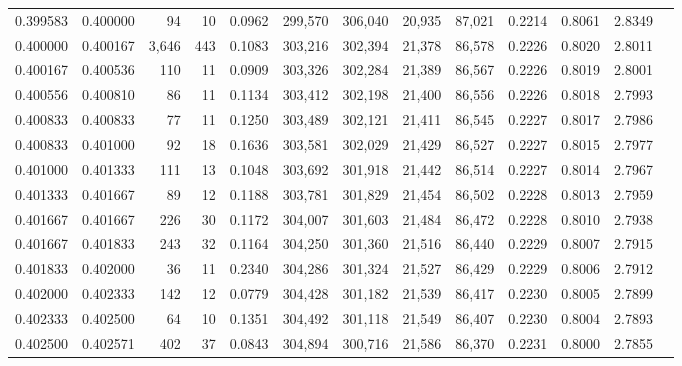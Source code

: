\begin{tabular}{rrrrrrrrrrrrr}
0.399583 & 0.400000 &    94 &  10 &                                     0.0962 & 299,570 & 306,040 &  20,935 &  87,021 & 0.2214 & 0.8061 & 2.8349 \\
0.400000 & 0.400167 & 3,646 & 443 &                                     0.1083 & 303,216 & 302,394 &  21,378 &  86,578 & 0.2226 & 0.8020 & 2.8011 \\
0.400167 & 0.400536 &   110 &  11 &                                     0.0909 & 303,326 & 302,284 &  21,389 &  86,567 & 0.2226 & 0.8019 & 2.8001 \\
0.400556 & 0.400810 &    86 &  11 &                                     0.1134 & 303,412 & 302,198 &  21,400 &  86,556 & 0.2226 & 0.8018 & 2.7993 \\
0.400833 & 0.400833 &    77 &  11 &                                     0.1250 & 303,489 & 302,121 &  21,411 &  86,545 & 0.2227 & 0.8017 & 2.7986 \\
0.400833 & 0.401000 &    92 &  18 &                                     0.1636 & 303,581 & 302,029 &  21,429 &  86,527 & 0.2227 & 0.8015 & 2.7977 \\
0.401000 & 0.401333 &   111 &  13 &                                     0.1048 & 303,692 & 301,918 &  21,442 &  86,514 & 0.2227 & 0.8014 & 2.7967 \\
0.401333 & 0.401667 &    89 &  12 &                                     0.1188 & 303,781 & 301,829 &  21,454 &  86,502 & 0.2228 & 0.8013 & 2.7959 \\
0.401667 & 0.401667 &   226 &  30 &                                     0.1172 & 304,007 & 301,603 &  21,484 &  86,472 & 0.2228 & 0.8010 & 2.7938 \\
0.401667 & 0.401833 &   243 &  32 &                                     0.1164 & 304,250 & 301,360 &  21,516 &  86,440 & 0.2229 & 0.8007 & 2.7915 \\
0.401833 & 0.402000 &    36 &  11 &                                     0.2340 & 304,286 & 301,324 &  21,527 &  86,429 & 0.2229 & 0.8006 & 2.7912 \\
0.402000 & 0.402333 &   142 &  12 &                                     0.0779 & 304,428 & 301,182 &  21,539 &  86,417 & 0.2230 & 0.8005 & 2.7899 \\
0.402333 & 0.402500 &    64 &  10 &                                     0.1351 & 304,492 & 301,118 &  21,549 &  86,407 & 0.2230 & 0.8004 & 2.7893 \\
0.402500 & 0.402571 &   402 &  37 &                                     0.0843 & 304,894 & 300,716 &  21,586 &  86,370 & 0.2231 & 0.8000 & 2.7855 \\

\end{tabular}

